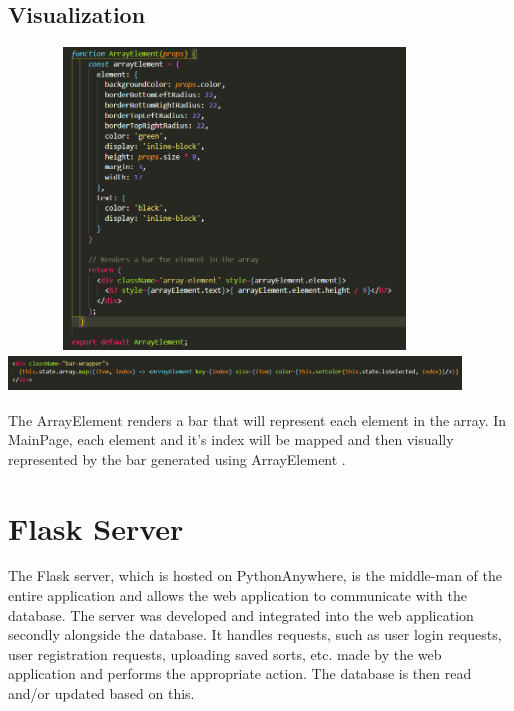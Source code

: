 \subsection{Visualization}
\begin{center}
    \includegraphics[height=8cm,width=12cm]{images/arrayelement}
    \includegraphics[height=1cm,width=12cm]{images/maparray}
\end{center}
The ArrayElement renders a bar that will represent each element in the array. In MainPage, each element and it's index will be mapped and then visually represented by the bar generated using ArrayElement \cite{react_bar}.

\newpage
\section{Flask Server}
The Flask server, which is hosted on PythonAnywhere, is the middle-man of the entire application and allows the web application to communicate with the database. The server was developed and integrated into the web application secondly alongside the database. It handles requests, such as user login requests, user registration requests, uploading saved sorts, etc. made by the web application and performs the appropriate action. The database is then read and/or updated based on this. 

